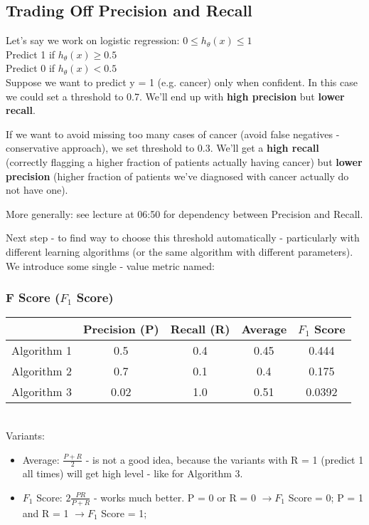 \documentclass{scrartcl}
\begin{document}
\subsection{Trading Off Precision and Recall}
\label{sec:11-4}

Let's say we work on logistic regression: $0 \leq h_\theta(x) \leq 1$ \\
Predict 1 if $h_\theta(x) \geq 0.5$ \\ Predict 0 if $h_\theta(x) <
0.5$ \\

Suppose we want to predict y = 1 (e.g. cancer) only when confident. In
this case we could set a threshold to 0.7. We'll end up with {\bf high
  precision } but {\bf lower recall}.

If we want to avoid missing too many cases of cancer (avoid false
negatives - conservative approach), we set threshold to 0.3. We'll get
a {\bf high recall} (correctly flagging a higher fraction of patients
actually having cancer) but {\bf lower precision} (higher fraction of
patients we've diagnosed with cancer actually do not have one).

More generally: see lecture at 06:50 for dependency between Precision
and Recall.

Next step - to find way to choose this threshold automatically -
particularly with different learning algorithms (or the same algorithm
with different parameters). We introduce some single - value metric
named:

\subsubsection{F Score ($F_1$ Score)}
\label{sec:11-4-1}
\begin{tabular}{c|cc|c|c}
  \quad & Precision (P) & Recall (R) & Average & $F_1$ Score\\
  \hline
  Algorithm 1 & 0.5 & 0.4 & 0.45 & 0.444 \\
  Algorithm 2 & 0.7 & 0.1 & 0.4 & 0.175\\
  Algorithm 3 & 0.02 & 1.0 & 0.51 & 0.0392
\end{tabular} \\

Variants:
\begin{itemize}
\item Average: $\frac{P + R}{2}$ - is not a good idea, because the
  variants with R = 1 (predict 1 all times) will get high level - like
  for Algorithm 3.
\item $F_1$ Score: $2\frac{PR}{P + R}$ - works much better. P = 0 or R
  = 0 $ \rightarrow F_1$ Score = 0; P = 1 and R = 1 $\rightarrow F_1$
  Score = 1;
\end{itemize}
\end{document}
